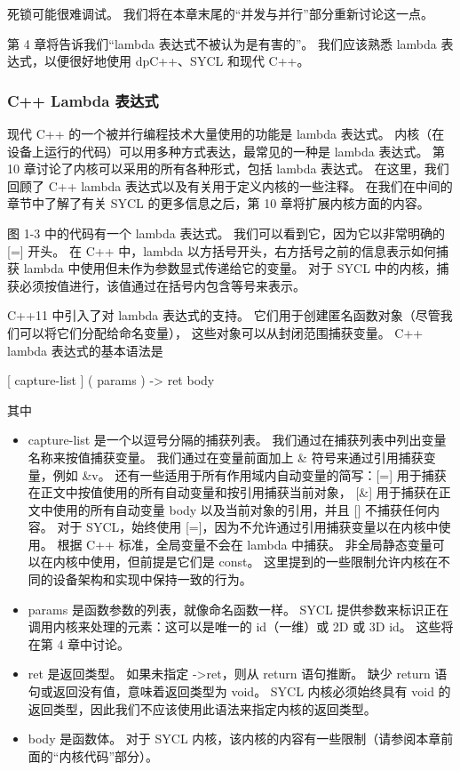 死锁可能很难调试。 我们将在本章末尾的“并发与并行”部分重新讨论这一点。

\begin{remark}
	第 4 章将告诉我们“lambda 表达式不被认为是有害的”。 
	我们应该熟悉 lambda 表达式，以便很好地使用 dpC++、SYCL 和现代 C++。
\end{remark}

\subsubsection{C++ Lambda 表达式}
现代 C++ 的一个被并行编程技术大量使用的功能是 lambda 表达式。 
内核（在设备上运行的代码）可以用多种方式表达，最常见的一种是 lambda 表达式。 
第 10 章讨论了内核可以采用的所有各种形式，包括 lambda 表达式。 
在这里，我们回顾了 C++ lambda 表达式以及有关用于定义内核的一些注释。 
在我们在中间的章节中了解了有关 SYCL 的更多信息之后，第 10 章将扩展内核方面的内容。

图 1-3 中的代码有一个 lambda 表达式。 我们可以看到它，因为它以非常明确的 [=] 开头。 
在 C++ 中，lambda 以方括号开头，右方括号之前的信息表示如何捕获 lambda 中使用但未作为参数显式传递给它的变量。 
对于 SYCL 中的内核，捕获必须按值进行，该值通过在括号内包含等号来表示。

C++11 中引入了对 lambda 表达式的支持。 它们用于创建匿名函数对象（尽管我们可以将它们分配给命名变量），
这些对象可以从封闭范围捕获变量。 C++ lambda 表达式的基本语法是

[ capture-list ] ( params ) -> ret { body }


其中

\begin{itemize}
	\item capture-list 是一个以逗号分隔的捕获列表。 我们通过在捕获列表中列出变量名称来按值捕获变量。 
	我们通过在变量前面加上 \& 符号来通过引用捕获变量，例如 \&v。 
	还有一些适用于所有作用域内自动变量的简写：[=] 用于捕获在正文中按值使用的所有自动变量和按引用捕获当前对象，
	[\&] 用于捕获在正文中使用的所有自动变量 body 以及当前对象的引用，并且 [] 不捕获任何内容。 
	对于 SYCL，始终使用 [=]，因为不允许通过引用捕获变量以在内核中使用。 
	根据 C++ 标准，全局变量不会在 lambda 中捕获。 
	非全局静态变量可以在内核中使用，但前提是它们是 const。 
	这里提到的一些限制允许内核在不同的设备架构和实现中保持一致的行为。

	\item params 是函数参数的列表，就像命名函数一样。 
	SYCL 提供参数来标识正在调用内核来处理的元素：这可以是唯一的 id（一维）或 2D 或 3D id。 
	这些将在第 4 章中讨论。

	\item ret 是返回类型。 如果未指定 ->ret，则从 return 语句推断。
	缺少 return 语句或返回没有值，意味着返回类型为 void。 
	SYCL 内核必须始终具有 void 的返回类型，因此我们不应该使用此语法来指定内核的返回类型。

	\item body 是函数体。 对于 SYCL 内核，该内核的内容有一些限制（请参阅本章前面的“内核代码”部分）。
\end{itemize}

